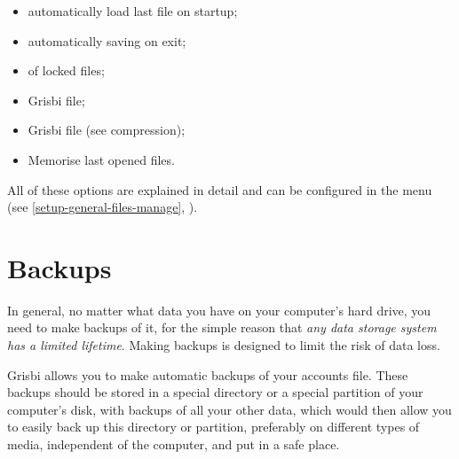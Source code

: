 \begin{itemize}
	\item automatically load last file on startup;
	\item automatically saving on exit;
	\item {} of locked files;
	\item {} Grisbi file;
	\item {} Grisbi file (see \gls{compression});
	\item Memorise last opened files.
\end{itemize}

All of these options are explained in detail and can be configured in the  menu (see \vref{setup-general-files-manage}, ).

\section{Backups\label{datamanagement-backups}}%

In general, no matter what data you have on your computer's hard drive, you need to make backups of it, for the simple reason that \emph{any data storage system has a limited lifetime}. Making backups is designed to limit the risk of data loss.

Grisbi allows you to make automatic backups of your accounts file. These backups should be stored in a special directory or a special \gls{partition} of your computer's disk, with backups of all your other data, which would then allow you to easily back up this directory or partition, preferably on different types of media, independent of the computer, and put in a safe place.

